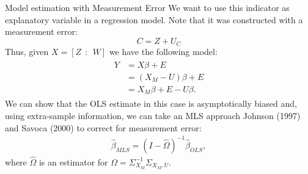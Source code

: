 \documentclass[handout,t,usenames,dvipsnames]{beamer}
\begin{document}
\begin{frame}{Model estimation with Measurement Error}
\justifying
\small
We want to use this indicator as explanatory variable in a regression model. Note that it was constructed with a measurement error:
$$ C = Z + U_{C}$$
Thus, given $X = [Z\ \ : \ \ W]$ we have the following model:
\begin{align*}
    \begin{split}
        Y &= X \beta + E\\
        &= (X_{M} - U) \beta + E\\
        &= X_{M}\beta + E - U\beta.
        \end{split}
\end{align*}
We can show that the OLS estimate in this case is asymptotically biased and, using extra-sample information, we can take an MLS approach Johnson (1997) and Savoca (2000)\nocite{book:johnston, Savoca} to correct for measurement error:
\begin{align*}
    \hat{\beta}_{MLS} = (I - \hat{\Omega})^{-1} \hat{\beta}_{OLS},
\end{align*}
where $\hat{\Omega}$ is an estimator for $\Omega = \Sigma^{-1}_{X_{M}} \Sigma_{X_{M},U}$. 
\end{frame}
\end{document}
